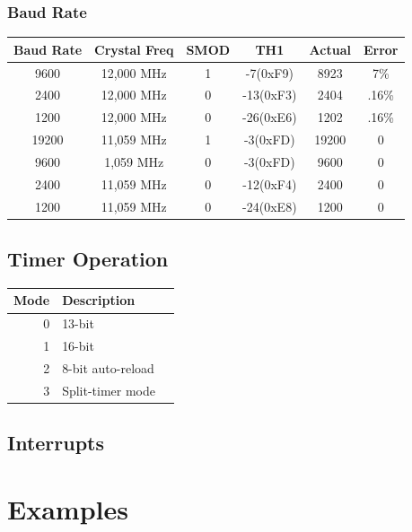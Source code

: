 \documentclass[journal]{IEEEtran}
\begin{document}
{\subsubsection{Baud Rate}
\begin{center}
	\begin{tabular}{c|c|c|c|c|c}
		Baud Rate & Crystal Freq & SMOD & TH1 & Actual & Error \\
		\hline
		9600 & 12,000 MHz & 1 & -7(0xF9) & 8923 & 7\%\\
		2400 & 12,000 MHz & 0 & -13(0xF3) & 2404 & .16\%\\
		1200 & 12,000 MHz & 0 & -26(0xE6) & 1202 & .16\%\\
		19200 & 11,059 MHz & 1 & -3(0xFD) & 19200 & 0 \\
		9600 & 1,059 MHz & 0 & -3(0xFD) & 9600 & 0 \\
		2400 & 11,059 MHz & 0 & -12(0xF4) & 2400 & 0 \\
		1200 & 11,059 MHz & 0 & -24(0xE8) & 1200 & 0 \\
	\end{tabular}
\end{center}

\subsection{Timer Operation}
\begin{center}
	\begin{tabular}{r|l c}
		Mode & Description \\
		\hline
		0 & 13-bit \\
		1 & 16-bit \\
		2 & 8-bit auto-reload \\
		3 & Split-timer mode \\
	\end{tabular}
\end{center}

\subsection{Interrupts}


\pagebreak
\section{Examples}
} %
\end{document}
